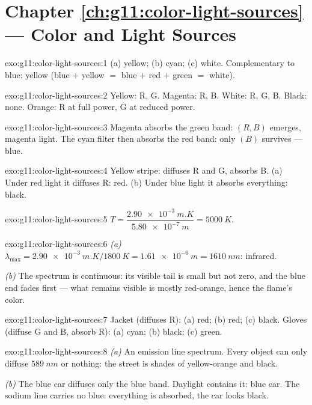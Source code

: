 \section*{Chapter \ref{ch:g11:color-light-sources} --- Color and Light Sources}

\begin{solution}{exo:g11:color-light-sources:1}
(a) yellow; (b) cyan; (c) white. Complementary to blue: yellow
(blue $+$ yellow $=$ blue $+$ red $+$ green $=$ white).
\end{solution}

\begin{solution}{exo:g11:color-light-sources:2}
Yellow: R, G. Magenta: R, B. White: R, G, B. Black: none. Orange: R at
full power, G at reduced power.
\end{solution}

\begin{solution}{exo:g11:color-light-sources:3}
Magenta absorbs the green band: $(R, B)$ emerges, magenta light. The
cyan filter then absorbs the red band: only $(B)$ survives --- blue.
\end{solution}

\begin{solution}{exo:g11:color-light-sources:4}
Yellow stripe: diffuses R and G, absorbs B. (a) Under red light it
diffuses R: red. (b) Under blue light it absorbs everything: black.
\end{solution}

\begin{solution}{exo:g11:color-light-sources:5}
$T = \dfrac{\qty{2.90e-3}{m.K}}{\qty{5.80e-7}{m}} = \qty{5000}{K}$.
\end{solution}

\begin{solution}{exo:g11:color-light-sources:6}
\emph{(a)} $\lambda_{\max} = \qty{2.90e-3}{m.K}/\qty{1800}{K}
= \qty{1.61e-6}{m} = \qty{1610}{nm}$: infrared.

\emph{(b)} The spectrum is continuous: its visible tail is small but not
zero, and the blue end fades first --- what remains visible is mostly
red-orange, hence the flame's color.
\end{solution}

\begin{solution}{exo:g11:color-light-sources:7}
Jacket (diffuses R): (a) red; (b) red; (c) black. Gloves (diffuse G and
B, absorb R): (a) cyan; (b) black; (c) green.
\end{solution}

\begin{solution}{exo:g11:color-light-sources:8}
\emph{(a)} An emission line spectrum. Every object can only diffuse
$\qty{589}{nm}$ or nothing: the street is shades of yellow-orange and
black.

\emph{(b)} The blue car diffuses only the blue band. Daylight contains
it: blue car. The sodium line carries no blue: everything is absorbed,
the car looks black.
\end{solution}

